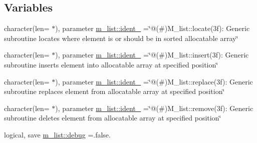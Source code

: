 \subsection*{Variables}
\begin{DoxyCompactItemize}
\item 
character(len= $\ast$), parameter \mbox{\hyperlink{namespacem__list_a5b8d48a0fc3218e8ed1d263a73748a27}{m\+\_\+list\+::ident\+\_}} =\char`\"{}@(\#)M\+\_\+list\+::locate(3f)\+: Generic subroutine locates where element is or should be in sorted allocatable array\char`\"{}
\item 
character(len= $\ast$), parameter \mbox{\hyperlink{namespacem__list_a25c880ddb1248291f9b143e99fd80870}{m\+\_\+list\+::ident\+\_}} =\char`\"{}@(\#)M\+\_\+list\+::insert(3f)\+: Generic subroutine inserts element into allocatable array at specified position\char`\"{}
\item 
character(len= $\ast$), parameter \mbox{\hyperlink{namespacem__list_a47ce2be826f94ee09c3b15b367504866}{m\+\_\+list\+::ident\+\_}} =\char`\"{}@(\#)M\+\_\+list\+::replace(3f)\+: Generic subroutine replaces element from allocatable array at specified position\char`\"{}
\item 
character(len= $\ast$), parameter \mbox{\hyperlink{namespacem__list_a9ff7bfbdf866c8a3a9fc831c228ce065}{m\+\_\+list\+::ident\+\_}} =\char`\"{}@(\#)M\+\_\+list\+::remove(3f)\+: Generic subroutine deletes element from allocatable array at specified position\char`\"{}
\item 
logical, save \mbox{\hyperlink{namespacem__list_aaa3ea916cd8c669ebbc8ec9096c5bbca}{m\+\_\+list\+::debug}} =.false.
\end{DoxyCompactItemize}
